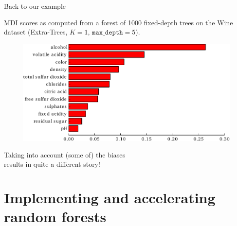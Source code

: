 \documentclass{beamer}
\begin{document}
\begin{frame}{Back to our example}

MDI scores as computed from a forest of 1000 fixed-depth trees on the  Wine
dataset (Extra-Trees, $K=1$, $\texttt{max\_depth}=5$).

\begin{figure}
    \includegraphics[scale=0.7]{./figures/imp-wine2.pdf}
\end{figure}

\begin{center}
Taking into account (some of) the biases\\
results in {\color{red} quite a different story}!
\end{center}

\end{frame}



\section{Implementing and accelerating random forests}
\end{document}
